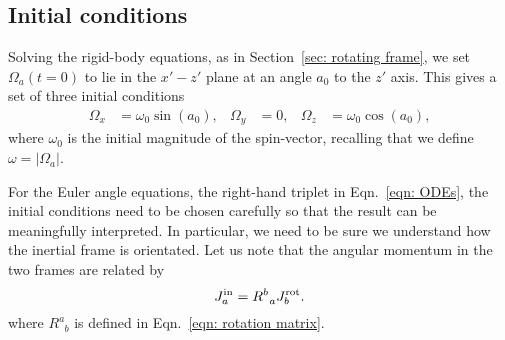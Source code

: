\documentclass[../full_thesis/full_thesis.tex]{subfiles}
\begin{document}

\subsection{Initial conditions}
\label{sec: initial conditions}

Solving the rigid-body equations, as in Section~\ref{sec:
rotating frame}, we set
$\Omega_a(t=0)$ to lie in the $x' - z'$ plane at an angle $a_{0}$ to the
$z'$ axis. This gives a set of three initial conditions
\begin{align}
\Omega_{x} & = \omega_{0}\sin(a_{0}), &
\Omega_{y} & = 0, &
\Omega_{z} & = \omega_{0}\cos(a_{0}),
\label{eqn: spin init}
\end{align}
where $\omega_0$ is the initial magnitude of the spin-vector, recalling that
we define $\omega = |\Omega_a|$.

For the Euler angle equations, the right-hand triplet in Eqn.~\eqref{eqn:
ODEs}, the initial conditions need to be chosen carefully so that the result
can be meaningfully interpreted. In particular, we need to be sure we understand
how the inertial frame is orientated. Let us note that the angular
momentum in the two frames are related by
\begin{equation}
J^{\textrm{in}}_a = R^{b}_{\;\;a} J^{\textrm{rot}}_b .
\label{eqn: transform}
\end{equation}
where $R^{a}_{\;\;b}$ is defined in Eqn.~\eqref{eqn: rotation matrix}.
\end{document}
